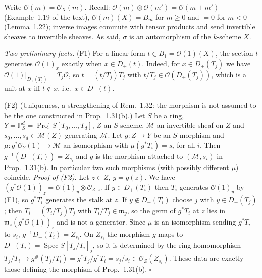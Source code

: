 \documentclass[11pt]{article}
\begin{document}
\pf
Write $\mathcal{O}(m)=\mathcal{O}_X(m)$. Recall: $\mathcal{O}(m)\otimes\mathcal{O}(m')=\mathcal{O}(m+m')$ (Example~1.19 of the text), $\mathcal{O}(m)(X)=B_m$ for $m\ge0$ and $=0$ for $m<0$ (Lemma~1.22); inverse images commute with tensor products and send invertible sheaves to invertible sheaves. As said, $\sigma$ is an automorphism of the $k$-scheme $X$.

\emph{Two preliminary facts.} (F1) For a linear form $t\in B_1=\mathcal{O}(1)(X)$, the section $t$ generates $\mathcal{O}(1)_x$ exactly when $x\in D_+(t)$. Indeed, for $x\in D_+(T_j)$ we have $\mathcal{O}(1)|_{D_+(T_j)}=T_j\mathcal{O}$, so $t=(t/T_j)T_j$ with $t/T_j\in\mathcal{O}(D_+(T_j))$, which is a unit at $x$ iff $t\notin x$, i.e.\ $x\in D_+(t)$.

(F2) (Uniqueness, a strengthening of Rem.~1.32: the morphism is not assumed to be the one constructed in Prop.~1.31(b).) Let $S$ be a ring, $Y=\mathbb{P}^d_S=\operatorname{Proj}S[T_0,\dots,T_d]$, $Z$ an $S$-scheme, $\mathcal{M}$ an invertible sheaf on $Z$ and $s_0,\dots,s_d\in\mathcal{M}(Z)$ generating $\mathcal{M}$. Let $g:Z\to Y$ be an $S$-morphism and $\mu:g^*\mathcal{O}_Y(1)\to\mathcal{M}$ an isomorphism with $\mu(g^*T_i)=s_i$ for all $i$. Then $g^{-1}(D_+(T_i))=Z_{s_i}$ and $g$ is the morphism attached to $(\mathcal{M},s_i)$ in Prop.~1.31(b). In particular two such morphisms (with possibly different $\mu$) coincide.
\emph{Proof of (F2).} Let $z\in Z$, $y=g(z)$. We have $(g^*\mathcal{O}(1))_z=\mathcal{O}(1)_y\otimes\mathcal{O}_{Z,z}$. If $y\in D_+(T_i)$ then $T_i$ generates $\mathcal{O}(1)_y$ by (F1), so $g^*T_i$ generates the stalk at $z$. If $y\notin D_+(T_i)$ choose $j$ with $y\in D_+(T_j)$; then $T_i=(T_i/T_j)T_j$ with $T_i/T_j\in\mathfrak{m}_y$, so the germ of $g^*T_i$ at $z$ lies in $\mathfrak{m}_z(g^*\mathcal{O}(1))_z$ and is not a generator. Since $\mu$ is an isomorphism sending $g^*T_i$ to $s_i$, $g^{-1}D_+(T_i)=Z_{s_i}$. On $Z_{s_i}$ the morphism $g$ maps to $D_+(T_i)=\operatorname{Spec}S[T_j/T_i]_j$, so it is determined by the ring homomorphism $T_j/T_i\mapsto g^\#(T_j/T_i)=g^*T_j/g^*T_i=s_j/s_i\in\mathcal{O}_Z(Z_{s_i})$. These data are exactly those defining the morphism of Prop.~1.31(b). $\square$
\end{document}
